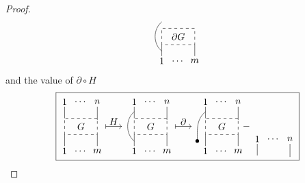 \documentclass{amsart}
\theoremstyle{definition}
\begin{document}
\begin{proof}
\begin{equation*}
{\begin{tikzpicture}[scale=.6]
			\draw [dashed] (0,0) rectangle (2,1); \node at (1, .5) {$\partial G$};
			
			\draw (0,-.4)  to[out=140,in=-140]  (0,1.4);
			\node at (0,-1) {$1$}; \draw (0,-.7) -- (0,0);
			\node at (1,-1) {$\dots$};
			\node at (2,-1) {$m$}; \draw (2,-.7) -- (2,0);
			\end{tikzpicture}}	
		\end{equation*}
		and the value of $\partial \circ H$
		\begin{equation*}
		\boxed{\begin{tikzpicture}[scale=.6]
			\node at (0,2) {$1$}; \draw (0,1.7) -- (0,1);
			\node at (1,2) {$\dots$};
			\node at (2,2) {$n$}; \draw (2,1.7) -- (2,.9);
			
			\draw [dashed] (0,0) rectangle (2,1); \node at (1, .5) {$G$};
			
			\node at (0,-1) {$1$}; \draw (0,-.7) -- (0,0);
			\node at (1,-1) {$\dots$};
			\node at (2,-1) {$m$}; \draw (2,-.7) -- (2,0);
			
			\node at (3,.8) {$H$}; \draw [|->] (2.5,.5) -- (3.5,.5);
			\end{tikzpicture}
			\  %
			\begin{tikzpicture}[scale=.6]
			\node at (0,2) {$1$}; \draw (0,1.7) -- (0,1);
			\node at (1,2) {$\dots$};
			\node at (2,2) {$n$}; \draw (2,1.7) -- (2,.9);
			
			\draw [dashed] (0,0) rectangle (2,1); \node at (1, .5) {$G$};
			
			\draw (0,-.4)  to[out=140,in=-140]  (0,1.4);
			\node at (0,-1) {$1$}; \draw (0,-.7) -- (0,0);
			\node at (1,-1) {$\dots$};
			\node at (2,-1) {$m$}; \draw (2,-.7) -- (2,0);
			
			\node at (3,.8) {$\partial$}; \draw [|->] (2.5,.5) -- (3.5,.5);
			\end{tikzpicture}
			\begin{tikzpicture}[scale=.6]
			\node at (0,2) {$1$}; \draw (0,1.7) -- (0,1);
			\node at (1,2) {$\dots$};
			\node at (2,2) {$n$}; \draw (2,1.7) -- (2,.9);
			
			\draw [dashed] (0,0) rectangle (2,1); \node at (1, .5) {$G$};
			
			\node at (-.5,-.4){$\bullet$}; \draw (-.5,-.4)  to[out=90,in=-140]  (0,1.4);
			\node at (0,-1) {$1$}; \draw (0,-.7) -- (0,0);
			\node at (1,-1) {$\dots$};
			\node at (2,-1) {$m$}; \draw (2,-.7) -- (2,0);
			
			\node at (2.5,.5) {$-$}; 
			\end{tikzpicture}
			\!%
			\begin{tikzpicture}[scale=.6]
			\node at (0,2) {$1$}; \draw (0,1.7) -- (0,1);
			\node at (1,2) {$\dots$};
			\node at (2,2) {$n$}; \draw (2,1.7) -- (2,.9);
			

\end{tikzpicture}}
\end{equation*}
\end{proof}
\end{document}
